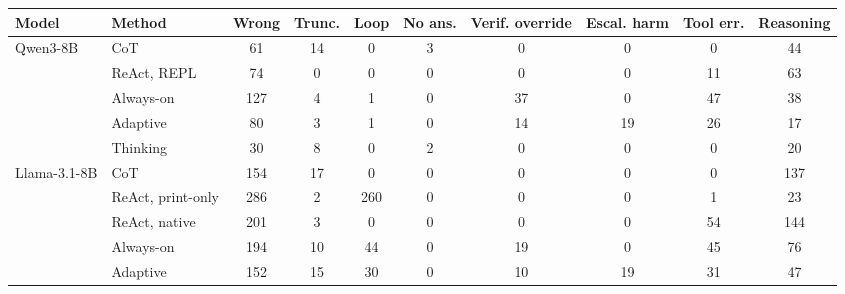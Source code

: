\begin{tabular}{llcccccccc}
\toprule
Model & Method & Wrong & Trunc. & Loop & No ans. & Verif. override & Escal. harm & Tool err. & Reasoning \\
\midrule
Qwen3-8B & CoT & 61 & 14 & 0 & 3 & 0 & 0 & 0 & 44 \\
 & ReAct, REPL & 74 & 0 & 0 & 0 & 0 & 0 & 11 & 63 \\
 & Always-on & 127 & 4 & 1 & 0 & 37 & 0 & 47 & 38 \\
 & Adaptive & 80 & 3 & 1 & 0 & 14 & 19 & 26 & 17 \\
 & Thinking & 30 & 8 & 0 & 2 & 0 & 0 & 0 & 20 \\
Llama-3.1-8B & CoT & 154 & 17 & 0 & 0 & 0 & 0 & 0 & 137 \\
 & ReAct, print-only & 286 & 2 & 260 & 0 & 0 & 0 & 1 & 23 \\
 & ReAct, native & 201 & 3 & 0 & 0 & 0 & 0 & 54 & 144 \\
 & Always-on & 194 & 10 & 44 & 0 & 19 & 0 & 45 & 76 \\
 & Adaptive & 152 & 15 & 30 & 0 & 10 & 19 & 31 & 47 \\
\bottomrule
\end{tabular}
